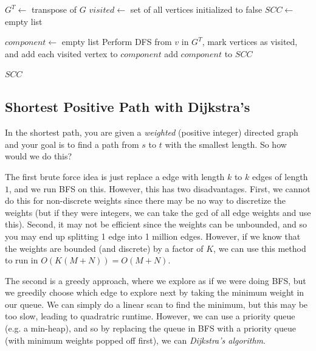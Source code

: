 \begin{algo}
\begin{algorithm}[H]
\begin{algorithmic}[1]
        \State $G^T \gets $ transpose of $G$ 
        \State $visited \gets $ set of all vertices initialized to false 
        \State $SCC \gets $ empty list 
        
         
           
            \State $component \gets $ empty list 
            \State Perform DFS from $v$ in $G^T$, mark vertices as visited, and add each visited vertex to $component$ 
            \State add $component$ to $SCC$ 
          \EndIf
        \EndFor
        
        \State \Return $SCC$ 
      \EndProcedure
    \end{algorithmic}
    \end{algorithm}
  \end{algo}

\subsection{Shortest Positive Path with Dijkstra's}

  In the shortest path, you are given a \textit{weighted} (positive integer) directed graph and your goal is to find a path from $s$ to $t$ with the smallest length. So how would we do this? 

  The first brute force idea is just replace a edge with length $k$ to $k$ edges of length $1$, and we run BFS on this. However, this has two disadvantages. First, we cannot do this for non-discrete weights since there may be no way to discretize the weights (but if they were integers, we can take the gcd of all edge weights and use this). Second, it may not be efficient since the weights can be unbounded, and so you may end up splitting 1 edge into 1 million edges. However, if we know that the weights are bounded (and discrete) by a factor of $K$, we can use this method to run in $O(K (M + N)) = O(M + N)$. 

  The second is a greedy approach, where we explore as if we were doing BFS, but we greedily choose which edge to explore next by taking the minimum weight in our queue. We can simply do a linear scan to find the minimum, but this may be too slow, leading to quadratric runtime. However, we can use a priority queue (e.g. a min-heap), and so by replacing the queue in BFS with a priority queue (with minimum weights popped off first), we can \textit{Dijkstra's algorithm}. 

